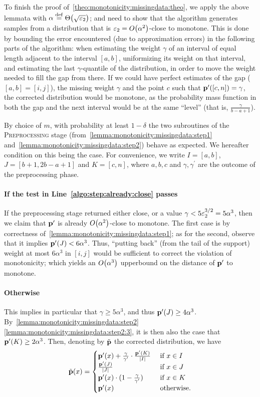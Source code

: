 \noindent To finish the proof of~\cref{theo:monotonicity:missingdata:theo}, we apply the above lemmata with  $\alpha\eqdef\bigTheta{\sqrt{\eps_2}}$; and need to show that the algorithm generates samples from a distribution that is $\eps_2=\bigO{\alpha^2}$-close to monotone. This is done by bounding the error encountered (due to approximation errors) in the following parts of the algorithm:  when estimating the weight $\gamma$ of an interval of equal length adjacent to the interval $[a,b]$, uniformizing its weight on that interval, and estimating the last $\gamma$-quantile of the distribution, in order to move the weight needed to fill the gap from there. 
If we could have perfect estimates of the gap ($[a,b]=[i,j]$), the missing weight $\gamma$ and the point $c$ such that $\mathbf{p}^\prime([c,n])=\gamma$, the corrected distribution would be monotone, as the probability mass function in both the gap and the next interval would be at the same ``level'' (that is, $\frac{\gamma}{b-a+1}$).

By choice of $m$, with probability at least $1-\delta$ the two subroutines of the \textsc{Preprocessing} stage (from~\cref{lemma:monotonicity:missingdata:step1} and~\cref{lemma:monotonicity:missingdata:step2}) behave as expected. We hereafter condition on this being the case. For convenience, we write $I=[a,b]$, $J=[b+1,2b-a+1]$ and $K=[c,n]$, where $a,b,c$ and $\gamma, \gamma^\prime$ are the outcome of the preprocessing phase.

\paragraph{If the test in Line~\ref{algo:step:already:close} passes}
If the preprocessing stage returned either \textsf{close}, or a value $\gamma < 5\varepsilon_2^{3/2}=5\alpha^3$, then we claim that $\mathbf{p}^\prime$ is already $\bigO{\alpha^2}$-close to monotone. The first case is by correctness of~\cref{lemma:monotonicity:missingdata:step1}; as for the second, observe that it implies $\mathbf{p}^\prime(J) < 6\alpha^3$. Thus, ``putting back'' (from the tail of the support) weight at most $6\alpha^3$ in $[i,j]$ would be sufficient to correct the violation of monotonicity; which yields an $\bigO{\alpha^3}$ upperbound on the distance of $\mathbf{p}^\prime$ to monotone.

\paragraph{Otherwise} This implies in particular that $\gamma \geq 5\alpha^3$, and thus $\mathbf{p}^\prime(J) \geq 4\alpha^3$. By~\cref{lemma:monotonicity:missingdata:step2} \ref{lemma:monotonicity:missingdata:step2:3}, it is then also the case that $\mathbf{p}^\prime(K) \geq 2\alpha^3$. Then, denoting by $\tilde{\mathbf{p}}$ the corrected distribution, we have
\[
\tilde{\mathbf{p}}(x) = \begin{cases}
 \mathbf{p}^\prime(x) + \frac{\gamma}{\gamma^\prime}\cdot\frac{\mathbf{p}^\prime(K)}{\left\lvert I \right\rvert} & \text{ if } x\in I \\
 \frac{\mathbf{p}^\prime(J)}{\left\lvert J \right\rvert} & \text{ if } x\in J \\
 \mathbf{p}^\prime(x)\cdot(1-\frac{\gamma}{\gamma^\prime}) & \text{ if } x\in K \\
 \mathbf{p}^\prime(x) & \text{ otherwise.}
\end{cases}
\]
